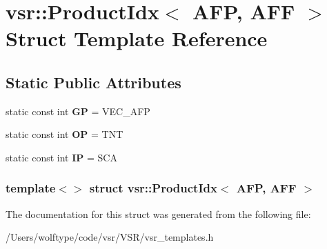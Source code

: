 \hypertarget{structvsr_1_1_product_idx_3_01_a_f_p_00_01_a_f_f_01_4}{\section{vsr\-:\-:Product\-Idx$<$ A\-F\-P, A\-F\-F $>$ Struct Template Reference}
\label{structvsr_1_1_product_idx_3_01_a_f_p_00_01_a_f_f_01_4}
}
\subsection*{Static Public Attributes}
\begin{DoxyCompactItemize}
\item 
\hypertarget{structvsr_1_1_product_idx_3_01_a_f_p_00_01_a_f_f_01_4_a08ef36c74ed8c65be95beb9419776812}{static const int {\bfseries G\-P} = V\-E\-C\-\_\-\-A\-F\-P}\label{structvsr_1_1_product_idx_3_01_a_f_p_00_01_a_f_f_01_4_a08ef36c74ed8c65be95beb9419776812}

\item 
\hypertarget{structvsr_1_1_product_idx_3_01_a_f_p_00_01_a_f_f_01_4_a13b5f233fce357d93f790afcd292193c}{static const int {\bfseries O\-P} = T\-N\-T}\label{structvsr_1_1_product_idx_3_01_a_f_p_00_01_a_f_f_01_4_a13b5f233fce357d93f790afcd292193c}

\item 
\hypertarget{structvsr_1_1_product_idx_3_01_a_f_p_00_01_a_f_f_01_4_a8212579314428c5dab44b9ab4ddf1ad0}{static const int {\bfseries I\-P} = S\-C\-A}\label{structvsr_1_1_product_idx_3_01_a_f_p_00_01_a_f_f_01_4_a8212579314428c5dab44b9ab4ddf1ad0}

\end{DoxyCompactItemize}
\subsubsection*{template$<$$>$ struct vsr\-::\-Product\-Idx$<$ A\-F\-P, A\-F\-F $>$}



The documentation for this struct was generated from the following file\-:\begin{DoxyCompactItemize}
\item 
/\-Users/wolftype/code/vsr/\-V\-S\-R/vsr\-\_\-templates.\-h\end{DoxyCompactItemize}

